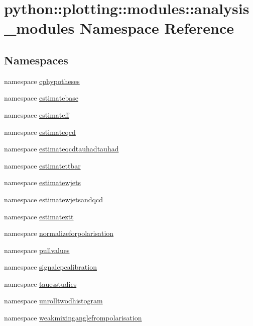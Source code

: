 \hypertarget{namespacepython_1_1plotting_1_1modules_1_1analysis__modules}{
\section{python::plotting::modules::analysis\_\-modules Namespace Reference}
\label{namespacepython_1_1plotting_1_1modules_1_1analysis__modules}
}
\subsection*{Namespaces}
\begin{DoxyCompactItemize}
\item 
namespace \hyperlink{namespacepython_1_1plotting_1_1modules_1_1analysis__modules_1_1cphypotheses}{cphypotheses}
\item 
namespace \hyperlink{namespacepython_1_1plotting_1_1modules_1_1analysis__modules_1_1estimatebase}{estimatebase}
\item 
namespace \hyperlink{namespacepython_1_1plotting_1_1modules_1_1analysis__modules_1_1estimateff}{estimateff}
\item 
namespace \hyperlink{namespacepython_1_1plotting_1_1modules_1_1analysis__modules_1_1estimateqcd}{estimateqcd}
\item 
namespace \hyperlink{namespacepython_1_1plotting_1_1modules_1_1analysis__modules_1_1estimateqcdtauhadtauhad}{estimateqcdtauhadtauhad}
\item 
namespace \hyperlink{namespacepython_1_1plotting_1_1modules_1_1analysis__modules_1_1estimatettbar}{estimatettbar}
\item 
namespace \hyperlink{namespacepython_1_1plotting_1_1modules_1_1analysis__modules_1_1estimatewjets}{estimatewjets}
\item 
namespace \hyperlink{namespacepython_1_1plotting_1_1modules_1_1analysis__modules_1_1estimatewjetsandqcd}{estimatewjetsandqcd}
\item 
namespace \hyperlink{namespacepython_1_1plotting_1_1modules_1_1analysis__modules_1_1estimateztt}{estimateztt}
\item 
namespace \hyperlink{namespacepython_1_1plotting_1_1modules_1_1analysis__modules_1_1normalizeforpolarisation}{normalizeforpolarisation}
\item 
namespace \hyperlink{namespacepython_1_1plotting_1_1modules_1_1analysis__modules_1_1pullvalues}{pullvalues}
\item 
namespace \hyperlink{namespacepython_1_1plotting_1_1modules_1_1analysis__modules_1_1signalcpcalibration}{signalcpcalibration}
\item 
namespace \hyperlink{namespacepython_1_1plotting_1_1modules_1_1analysis__modules_1_1tauesstudies}{tauesstudies}
\item 
namespace \hyperlink{namespacepython_1_1plotting_1_1modules_1_1analysis__modules_1_1unrolltwodhistogram}{unrolltwodhistogram}
\item 
namespace \hyperlink{namespacepython_1_1plotting_1_1modules_1_1analysis__modules_1_1weakmixinganglefrompolarisation}{weakmixinganglefrompolarisation}
\end{DoxyCompactItemize}
